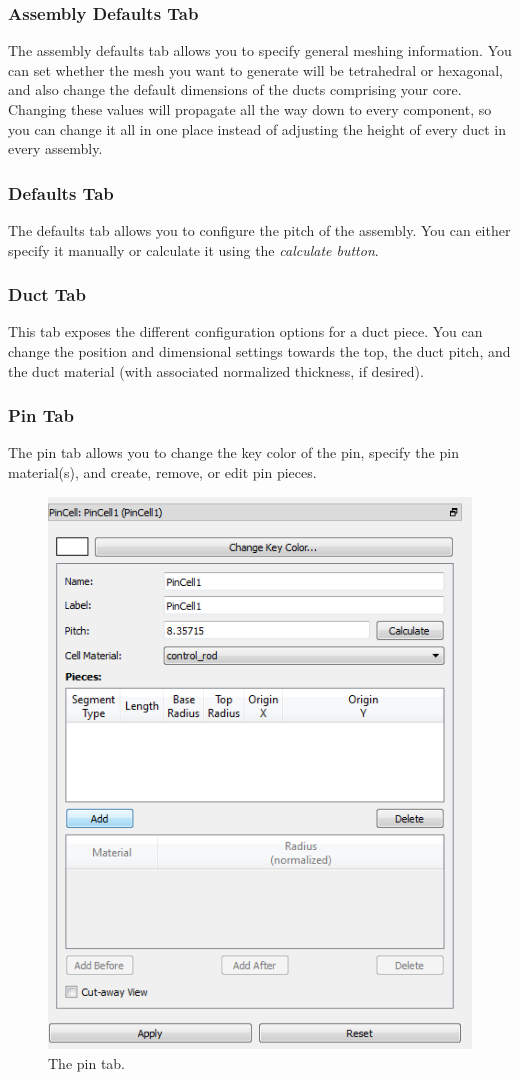 \subsubsection{Assembly Defaults Tab}
The assembly defaults tab allows you to specify general meshing information.  You can set whether the mesh you want to generate will be tetrahedral or hexagonal, and also change the default dimensions of the ducts comprising your core.  Changing these values will propagate all the way down to every component, so you can change it all in one place instead of adjusting the height of every duct in every assembly.


\subsubsection{Defaults Tab}
The defaults tab allows you to configure the pitch of the assembly.  You can either specify it manually or calculate it using the \emph{calculate button}.

\subsubsection{Duct Tab}
This tab exposes the different configuration options for a duct piece.  You can change the position and dimensional settings towards the top, the duct pitch, and the duct material (with associated normalized thickness, if desired).

\subsubsection{Pin Tab}
The pin tab allows you to change the key color of the pin, specify the pin material(s), and create, remove, or edit pin pieces.

\begin{figure}[h]
	\begin{center}
		\includegraphics[width=0.4\linewidth]{Images/hex-11.png}
		\caption{The pin tab.}
		\label{fig:pintab}
	\end{center}
\end{figure}

